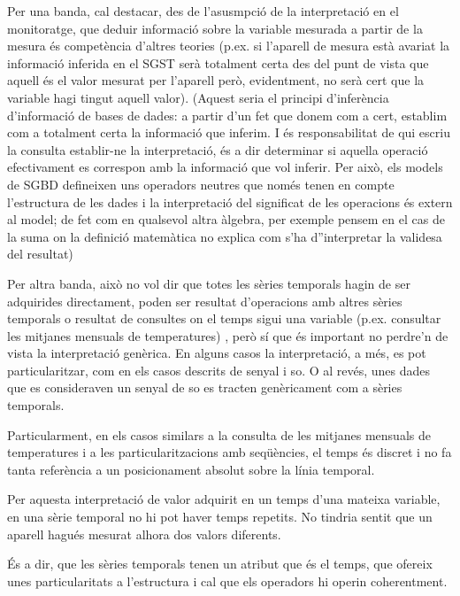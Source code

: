 \todo{}




  Per una banda, cal destacar, des de l'asusmpció de la interpretació en el monitoratge,
 que deduir informació sobre la variable
  mesurada a partir de la mesura és competència d'altres teories
  (p.ex. si l'aparell de mesura està avariat la informació inferida en
  el SGST serà totalment certa des del punt de vista que aquell és el
  valor mesurat per l'aparell però, evidentment, no serà cert que la
  variable hagi tingut aquell valor). (Aquest seria el principi
  d'inferència d'informació de bases de dades: a partir d'un fet que
  donem com a cert, establim com a totalment certa la informació que
  inferim. I és responsabilitat de qui escriu la consulta establir-ne
  la interpretació, és a dir determinar si aquella operació
  efectivament es correspon amb la informació que vol inferir. Per
  això, els models de SGBD defineixen uns operadors neutres que només
  tenen en compte l'estructura de les dades i la interpretació del
  significat de les operacions és extern al model; de fet com en
  qualsevol altra àlgebra, per exemple pensem en el cas de la suma on
  la definició matemàtica no explica com s'ha d''interpretar la
  validesa del resultat)

  Per altra banda, això no vol dir que totes les sèries temporals hagin de
  ser adquirides directament, poden ser resultat d'operacions amb
  altres sèries temporals o resultat de consultes on el temps sigui
  una variable (p.ex. consultar les mitjanes mensuals de temperatures)
 , però sí
  que és important no perdre'n de vista la interpretació genèrica. En
  alguns casos la interpretació, a més, es pot particularitzar, com en
  els casos descrits de senyal i so. O al revés, unes dades que es
  consideraven un senyal de so es tracten genèricament com a sèries
  temporals.

  Particularment, en els casos similars a la consulta de les mitjanes
  mensuals de temperatures i a les particularitzacions amb seqüències,
  el temps és discret i no fa tanta referència a un posicionament
  absolut sobre la línia temporal.


Per aquesta interpretació de valor adquirit en un temps d'una mateixa variable, en una sèrie temporal no hi pot haver temps repetits. No tindria sentit que un aparell hagués mesurat alhora dos valors diferents.
  

És a dir, que les sèries temporals tenen un atribut que és el temps,
que ofereix unes particularitats a l'estructura i cal que els
operadors hi operin coherentment.




